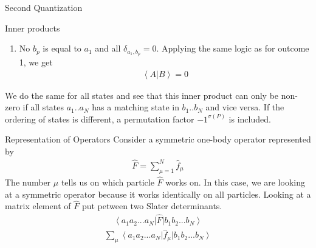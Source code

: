 \documentclass[twoside,english]{uiofysmaster}
\begin{document}
\begin{chapter}{Second Quantization}
\begin{section}{Inner products}
\begin{enumerate}
			This will now give us a new and shorter inner product
			\begin{align}
				\left< A | B \right> = \left< 0 \right| \hat a_N ... \hat a_2 \hat b_1^\dagger... \hat b_{p-1}^\dagger \hat b_{p+1}^\dagger ... \hat b_N^\dagger \left| 0 \right>(-1)^{p-1} - \left< 0 \right| \hat a_N ... \hat a_2 \hat b_1^\dagger \hat b_2^\dagger ... \hat b_N^\dagger \hat a_1  \left| 0 \right>
			\end{align}
			Where the last term will vanish because of $\hat a_1 \left| 0 \right> = 0$. Notice the sign factor coming from $(-1)^{p-1}$. This is due to interchanging creation operators when moving $\hat b_p^\dagger$ from position $p$ and $(p-1)$ steps to the left before using (\ref{InnerProduct1}).  
			\item No $b_p$ is equal to $a_1$ and all $\delta_{a_1, b_p} = 0$. Applying the same logic as for outcome 1, we get
			\begin{align}
				\left< A | B \right> = 0
			\end{align}
		\end{enumerate}
		We do the same for all states and see that this inner product can only be non-zero if all states $a_1 .. a_N$ has a matching state in $b_1 .. b_N$ and vice versa. If the ordering of states is different, a permutation factor $-1^{\sigma(P)}$ is included. 
	\end{section}

	\begin{section}{Representation of Operators}
		Consider a symmetric one-body operator represented by
		\begin{align}
			\hat F = \sum_{\mu = 1}^N \hat f_\mu 
		\end{align}
		The number $\mu$ tells us on which particle $\hat F$ works on. In this case, we are looking at a symmetric operator because it works identically on all particles. Looking at a matrix element of $\hat F$ put petween two Slater determinants. 
		\begin{align}
			\left< a_1 a_2 ... a_N \right| \hat F \left| b_1 b_2 ... b_N \right> 
		\end{align}
		\begin{align}
			\sum_\mu \left< a_1 a_2 ... a_N \right| \hat f_\mu \left| b_1 b_2 ... b_N \right> 
		\end{align}


\end{section}
\end{chapter}
\end{document}
